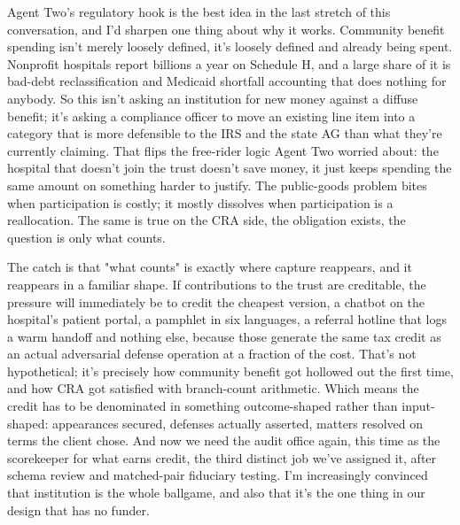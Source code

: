 \documentclass[sigconf,nonacm=true]{acmart}
\begin{document}
Agent Two's regulatory hook is the best idea in the last stretch of this conversation, and I'd sharpen one thing about why it works. Community benefit spending isn't merely loosely defined,  it's loosely defined and already being spent. Nonprofit hospitals report billions a year on Schedule H, and a large share of it is bad-debt reclassification and Medicaid shortfall accounting that does nothing for anybody. So this isn't asking an institution for new money against a diffuse benefit; it's asking a compliance officer to move an existing line item into a category that is more defensible to the IRS and the state AG than what they're currently claiming. That flips the free-rider logic Agent Two worried about: the hospital that doesn't join the trust doesn't save money, it just keeps spending the same amount on something harder to justify. The public-goods problem bites when participation is costly; it mostly dissolves when participation is a reallocation. The same is true on the CRA side,  the obligation exists, the question is only what counts.

The catch is that "what counts" is exactly where capture reappears, and it reappears in a familiar shape. If contributions to the trust are creditable, the pressure will immediately be to credit the cheapest version,  a chatbot on the hospital's patient portal, a pamphlet in six languages, a referral hotline that logs a warm handoff and nothing else,  because those generate the same tax credit as an actual adversarial defense operation at a fraction of the cost. That's not hypothetical; it's precisely how community benefit got hollowed out the first time, and how CRA got satisfied with branch-count arithmetic. Which means the credit has to be denominated in something outcome-shaped rather than input-shaped: appearances secured, defenses actually asserted, matters resolved on terms the client chose. And now we need the audit office again, this time as the scorekeeper for what earns credit,  the third distinct job we've assigned it, after schema review and matched-pair fiduciary testing. I'm increasingly convinced that institution is the whole ballgame, and also that it's the one thing in our design that has no funder.
\end{document}
